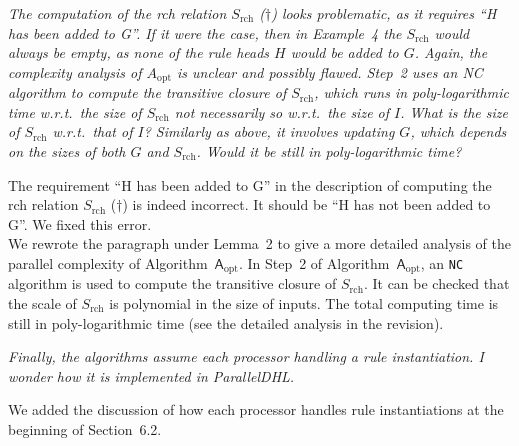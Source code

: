 \documentclass{article}
\let\quoteOld\quote
\let\endquoteOld\endquote
\renewenvironment{quote}{\quoteOld\itshape}{\endquoteOld}
\begin{document}
\begin{quote}
The computation of the rch relation $S_{\text{rch}}$ ($\dag$) looks problematic, as it requires ``H has been added to G''. If it were the case, then in Example~4 the $S_{\text{rch}}$ would always be empty, as none of the rule heads $H$ would be added to $G$. Again, the complexity analysis of $A_{\text{opt}}$ is unclear and possibly flawed. Step~2 uses an NC algorithm to compute the transitive closure of $S_{\text{rch}}$, which runs in poly-logarithmic time w.r.t.\ the size of $S_{\text{rch}}$ not necessarily so w.r.t.\ the size of $I$. What is the size of $S_{\text{rch}}$ w.r.t.\ that of $I$? Similarly as above, it involves updating $G$, which depends on the sizes of both $G$ and $S_{\text{rch}}$. Would it be still in poly-logarithmic time?
\end{quote}

The requirement ``H has been added to G'' in the description of computing the rch relation $S_{\text{rch}}$ ($\dag$) is indeed
incorrect. It should be ``H has not been added to G''. We fixed this error.\\

We rewrote the paragraph under Lemma~2 to give a more detailed
analysis of the parallel complexity of Algorithm~$\mathsf{A}_{\text{opt}}$.
In Step~2 of Algorithm~$\mathsf{A}_{\text{opt}}$, an \texttt{NC} algorithm is used to compute
the transitive closure of $S_{\text{rch}}$.
It can be checked that the scale of $S_{\text{rch}}$ is polynomial in the size of inputs.
The total computing time is still in poly-logarithmic time (see the detailed analysis in the revision).


\begin{quote}
Finally, the algorithms assume each processor handling a rule instantiation. I wonder how it is implemented in ParallelDHL.
\end{quote}

We added the discussion of how each processor handles rule instantiations at the beginning of Section~6.2.
\end{document}
